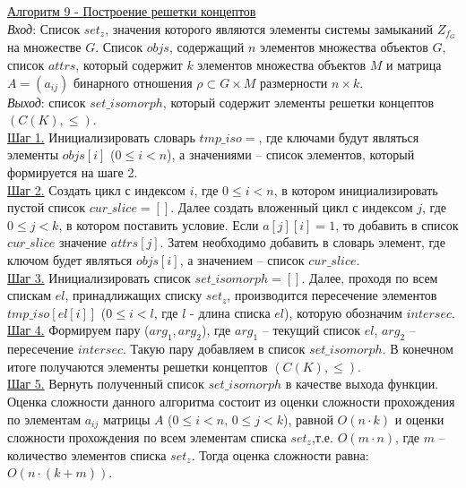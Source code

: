 \documentclass[bachelor, och, labwork]{shiza}
\begin{document}
        \underline{Алгоритм 9 - Построение решетки концептов}\\
            \textit{Вход}: Список $set_z$, значения которого являются элементы системы замыканий $Z_{f_G}$
            на множестве $G$. Список $objs$, содержащий $n$ элементов множества объектов $G$, список $attrs$, 
            который содержит $k$ элементов множества объектов $M$ и матрица $A = (a_{ij})$ бинарного отношения
            $\rho \subset G \times M$ размерности $n \times k$. \\
            \textit{Выход}: список $set\_isomorph$, который содержит элементы решетки концептов $(C(K), \leq)$. \\
            \underline{Шаг 1.} Инициализировать словарь $tmp\_iso = {}$, где ключами будут являться элементы
            $objs[i]$ ($0 \leq i < n$), а значениями -- список элементов, который формируется на шаге 2.\\
            \underline{Шаг 2.} Создать цикл с индексом $i$, где $0 \leq i < n$, в котором инициализировать
            пустой список $cur\_slice = []$. Далее создать вложенный цикл с индексом $j$, где $0 \leq j < k$,
            в котором поставить условие. Если $a[j][i] = 1$, то добавить в список $cur\_slice$ значение $attrs[j]$.
            Затем необходимо добавить в словарь элемент, где ключом будет являться $objs[i]$, а значением -- список
            $cur\_slice$. \\ 
            \underline{Шаг 3.} Инициализировать список $set\_isomorph = []$. Далее, проходя по всем спискам $el$, принадлижащих
            списку $set_z$, производится пересечение элементов $tmp\_iso[el[i]]$ ($0 \leq i < l$, где $l$ - длина списка $el$),
            которую обозначим $intersec$.
            \underline{Шаг 4.} Формируем пару ($arg_1, arg_2$), где $arg_1$ -- текущий список $el$, $arg_2$ -- пересечение
            $intersec$. Такую пару добавляем в список $set\_isomorph$. В конечном итоге получаются элементы решетки
            концептов $(C(K), \leq)$.\\
            \underline{Шаг 5.} Вернуть полученный список $set\_isomorph$ в качестве выхода функции.\\

            Оценка сложности данного алгоритма состоит из оценки сложности прохождения по элементам $a_{ij}$ матрицы $A$ 
            ($0 \leq i < n$, $0 \leq j < k$), равной $O(n \cdot k)$ и оценки сложности прохождения по всем элементам списка $set_z$,т.е.
            $O(m \cdot n)$, где $m$ -- количество элементов списка $set_z$. Тогда оценка сложности равна: $O(n \cdot (k + m))$.\\
\end{document}
